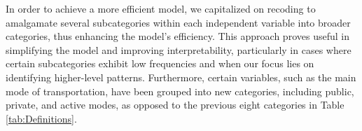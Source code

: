 \documentclass[
11pt, %
oneside, %
english, %
singlespacing, %
]{macthesis} %
\begin{document}
In order to achieve a more efficient model, we capitalized on recoding to amalgamate several subcategories within each independent variable into broader categories, thus enhancing the model's efficiency. This approach proves useful in simplifying the model and improving interpretability, particularly in cases where certain subcategories exhibit low frequencies and when our focus lies on identifying higher-level patterns. Furthermore, certain variables, such as the main mode of transportation, have been grouped into new categories, including public, private, and active modes, as opposed to the previous eight categories in Table \ref{tab:Definitions}.
\begin{table}

\caption{\label{tab:unnamed-chunk-24}\label{tab:Descriptive statistics of variables}Descriptive statistics of variables}
\centering
{}
\end{table}
\end{document}
